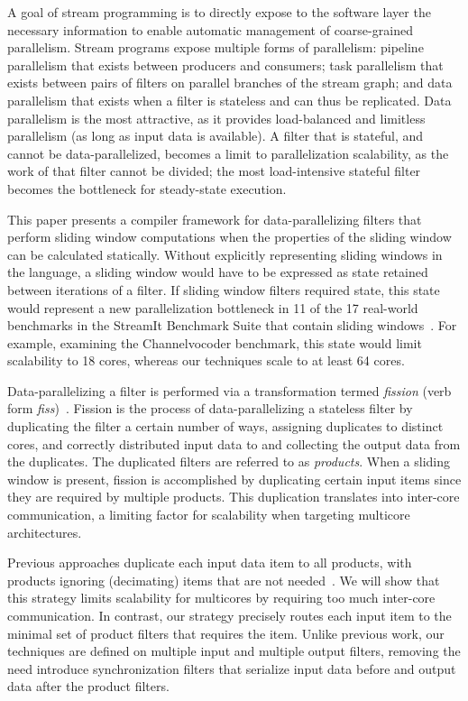 A goal of stream programming is to directly expose to the software
layer the necessary information to enable automatic management of
coarse-grained parallelism.  Stream programs expose multiple forms of
parallelism: pipeline parallelism that exists between producers and
consumers; task parallelism that exists between pairs of filters on
parallel branches of the stream graph; and data parallelism that
exists when a filter is stateless and can thus be replicated.  Data
parallelism is the most attractive, as it provides load-balanced and
limitless parallelism (as long as input data is available).  A filter
that is stateful, and cannot be data-parallelized, becomes a limit to
parallelization scalability, as the work of that filter cannot be
divided; the most load-intensive stateful filter becomes the
bottleneck for steady-state execution.

This paper presents a compiler framework for data-parallelizing
filters that perform sliding window computations when the properties
of the sliding window can be calculated statically.   Without explicitly
representing sliding windows in the language, a sliding window would
have to be expressed as state retained between iterations of a
filter.  If sliding window filters required state, this state would
represent a new parallelization bottleneck in 11 of the
17 real-world benchmarks in the StreamIt Benchmark Suite 
that contain sliding windows~\cite{streamit-suite}.  For example, 
examining the Channelvocoder benchmark, this state would limit scalability to
18 cores, whereas our techniques scale to at least 64 cores.

Data-parallelizing a filter is performed via a transformation termed
{\it fission} (verb form {\it fiss})~\cite{streamit-asplos}.  Fission
is the process of data-parallelizing a stateless filter by duplicating
the filter a certain number of ways, assigning duplicates to distinct
cores, and correctly distributed input data to and collecting the
output data from the duplicates.  The duplicated filters are referred
to as {\it products}.  When a sliding window is present, fission is
accomplished by duplicating certain input items since they are
required by multiple products.  This duplication translates into
inter-core communication, a limiting factor for scalability when
targeting multicore architectures.

Previous approaches duplicate each input data item to all products,
with products ignoring (decimating) items that are not
needed~\cite{streamit-asplos}.  We will show that this strategy limits
scalability for multicores by requiring too much inter-core
communication.  In contrast, our strategy precisely routes each input
item to the minimal set of product filters that requires the item.
Unlike previous work, our techniques are defined on
multiple input and multiple output filters, removing the need
introduce synchronization filters that serialize input data before and
output data after the product filters.  

